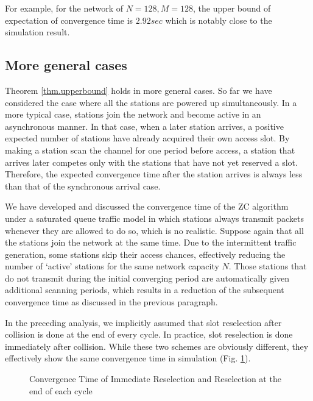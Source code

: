 \documentclass{acm_proc_article-sp}
\begin{document}
For example, for the network of $N=128, M=128$, the upper bound of expectation of convergence time is $2.92sec$ which is notably close to the simulation result.




\subsection{More general cases}
Theorem \ref{thm.upperbound} holds in more general cases. So far we have considered the case where all the stations are powered up simultaneously. In a more typical case, stations join the network and become active in an asynchronous manner. In that case, when a later station arrives, a positive expected number of stations have already acquired their own access slot. By making a station scan the channel for one period before access, a station that arrives later competes only with the stations that have not yet reserved a slot. Therefore, the expected convergence time after the station arrives is always less than that of the synchronous arrival case.

We have developed and discussed the convergence time of the ZC algorithm under a saturated queue traffic model in which stations always transmit packets whenever they are allowed to do so, which is no realistic.  Suppose again that all the stations join the network at the same time. Due to the intermittent traffic generation, some stations skip their access chances, effectively reducing the number of `active' stations for the same network capacity $N$. Those stations that do not transmit during the initial converging period are automatically given additional scanning periods, which results in a reduction of the subsequent convergence time as discussed in the previous paragraph. 

In the preceding analysis, we implicitly assumed that slot reselection after collision is done at the end of every cycle. In practice, slot reselection is done immediately after collision. While these two schemes are obviously different, they effectively show the same convergence time in simulation (Fig. \ref{fig.reselection}).
\begin{figure}
   \begin{center}
   \end{center}
   \begin{center}
   \caption{Convergence Time of Immediate Reselection and Reselection at the end of each cycle}
   \label{fig.reselection}
   \end{center}
\vspace{-0.2in}
\end{figure}
\end{document}
